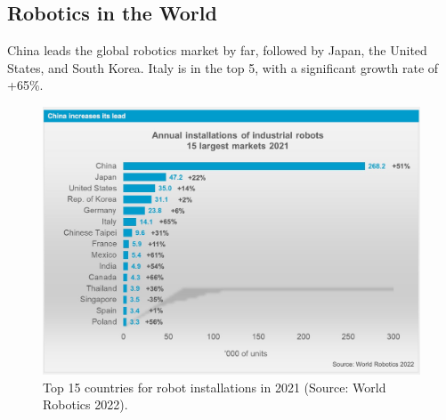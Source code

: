 \hfill

\subsection{Robotics in the World}

China leads the global robotics market by far, followed by Japan, the United States, and South Korea. Italy is in the top 5, with a significant growth rate of +65\%.

\begin{figure}[H]
  \centering
  \includegraphics[width=0.85\linewidth]{imgs/robotics_by_country.png}
  \caption{Top 15 countries for robot installations in 2021 (Source: World Robotics 2022).}
\end{figure}

\newpage
